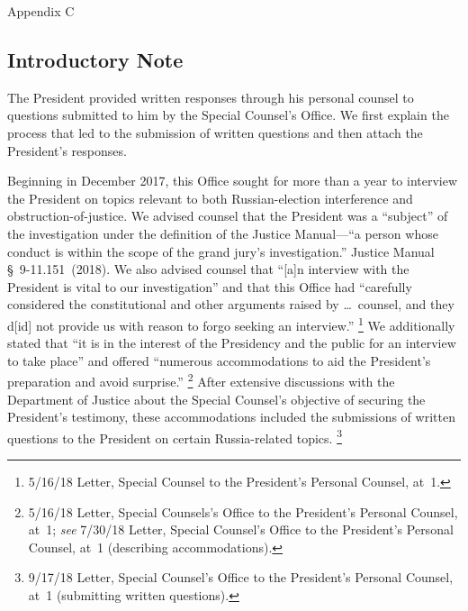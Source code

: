 
\thispagestyle{empty}

\vspace*{15em}

\begin{center}

\Huge
Appendix C

\end{center}

\newpage

\subsection{Introductory Note}

The President provided written responses through his personal counsel to questions submitted to him by the Special Counsel's Office. We first explain the process that led to the submission of written questions and then attach the President's responses.

Beginning in December 2017, this Office sought for more than a year to interview the President on topics relevant to both Russian-election interference and obstruction-of-justice.
We advised counsel that the President was a ``subject'' of the investigation under the definition of the Justice Manual---``a person whose conduct is within the scope of the grand jury's investigation.''
Justice Manual \S~9-11.151~(2018).
We also advised counsel that ``[a]n interview with the President is vital to our investigation'' and that this Office had ``carefully considered the constitutional and other arguments raised by \dots\ counsel, and they d[id] not provide us with reason to forgo seeking an interview.''%
\footnote{5/16/18 Letter, Special Counsel to the President's Personal Counsel, at~1.}
We additionally stated that ``it is in the interest of the Presidency and the public for an interview to take place'' and offered ``numerous accommodations to aid the President's preparation and avoid surprise.''%
\footnote{5/16/18 Letter, Special Counsels's Office to the President's Personal Counsel, at~1;
\textit{see} 7/30/18 Letter, Special Counsel's Office to the President's Personal Counsel, at~1 (describing accommodations).}
After extensive discussions with the Department of Justice about the Special Counsel's objective of securing the President's testimony, these accommodations included the submissions of written questions to the President on certain Russia-related topics.%
\footnote{9/17/18 Letter, Special Counsel's Office to the President's Personal Counsel, at~1 (submitting written questions).}

